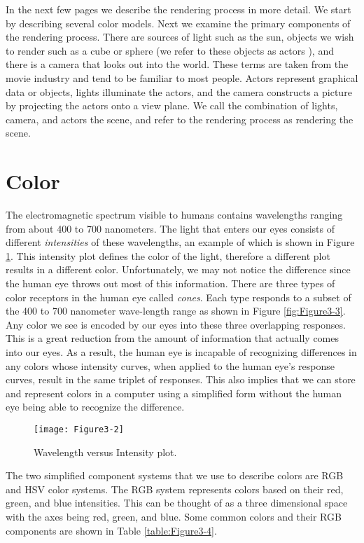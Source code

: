 In the next few pages we describe the rendering process in more detail. We start by describing several color models. Next we examine the primary components of the rendering process. There are sources of light such as the sun, objects we wish to render such as a cube or sphere (we refer to these objects as actors ), and there is a camera that looks out into the world. These terms are taken from the movie industry and tend to be familiar to most people. Actors represent graphical data or objects, lights illuminate the actors, and the camera constructs a picture by projecting the actors onto a view plane. We call the combination of lights, camera, and actors the scene, and refer to the rendering process as rendering the scene.

\section{Color}
The electromagnetic spectrum visible to humans contains wavelengths ranging from about 400 to 700 nanometers. The light that enters our eyes consists of different \emph{intensities} of these wavelengths, an example of which is shown in Figure \ref{fig:Figure3-2}. This intensity plot defines the color of the light, therefore a different plot results in a different color. Unfortunately, we may not notice the difference since the human eye throws out most of this information. There are three types of color receptors in the human eye called \emph{cones}. Each type responds to a subset of the 400 to 700 nanometer wave-length range as shown in Figure \ref{fig:Figure3-3}. Any color we see is encoded by our eyes into these three overlapping responses. This is a great reduction from the amount of information that actually comes into our eyes. As a result, the human eye is incapable of recognizing differences in any colors whose intensity curves, when applied to the human eye's response curves, result in the same triplet of responses. This also implies that we can store and represent colors in a computer using a simplified form without the human eye being able to recognize the difference.

\begin{figure}[!htb]
  \centering
  \texttt{[image: Figure3-2]}\\
  \caption{Wavelength versus Intensity plot.}\label{fig:Figure3-2}
\end{figure}

The two simplified component systems that we use to describe colors are RGB and HSV color systems. The RGB system represents colors based on their red, green, and blue intensities. This can be thought of as a three dimensional space with the axes being red, green, and blue. Some common colors and their RGB components are shown in Table \ref{table:Figure3-4}.

